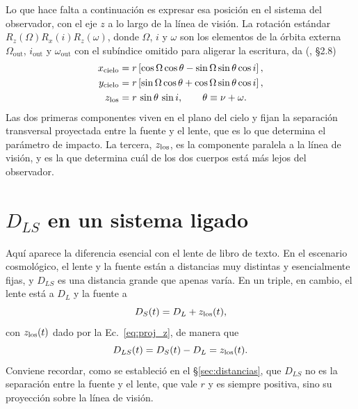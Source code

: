 \documentclass[11pt,a4paper,openany]{book}
\begin{document}
Lo que hace falta a continuaci\'on es expresar esa posici\'on en el sistema
del observador, con el eje $z$ a lo largo de la l\'inea de visi\'on. La
rotaci\'on est\'andar $R_z(\Omega)R_x(i)R_z(\omega)$, donde $\Omega$, $i$ y
$\omega$ son los elementos de la \'orbita externa
$\Omega_\mathrm{out}$, $i_\mathrm{out}$ y $\omega_\mathrm{out}$ con el
sub\'indice omitido para aligerar la escritura, da
(\citealp{MurrayDermott1999}, \S2.8)
\begin{align}
  x_{\rm cielo} &= r\left[\cos\Omega\cos\theta
                  -\sin\Omega\sin\theta\cos i\right], \label{eq:proj_x}\\
  y_{\rm cielo} &= r\left[\sin\Omega\cos\theta
                  +\cos\Omega\sin\theta\cos i\right], \label{eq:proj_y}\\
  z_{\rm los}   &= r\,\sin\theta\,\sin i ,
  \qquad \theta\equiv\nu+\omega .
  \label{eq:proj_z}
\end{align}
Las dos primeras componentes viven en el plano del cielo y fijan la
separaci\'on transversal proyectada entre la fuente y el lente, que es lo que
determina el par\'ametro de impacto. La tercera, $z_{\rm los}$, es la
componente paralela a la l\'inea de visi\'on, y es la que determina cu\'al de
los dos cuerpos est\'a m\'as lejos del observador.

\section{\texorpdfstring{$D_{LS}$}{D\_LS} en un sistema ligado}
\label{sec:dls}

Aqu\'i aparece la diferencia esencial con el lente de libro de texto. En el
escenario cosmol\'ogico, el lente y la fuente est\'an a distancias muy
distintas y esencialmente fijas, y $D_{LS}$ es una distancia grande que apenas
var\'ia. En un triple, en cambio, el lente est\'a a $D_L$ y la fuente a
\begin{equation}
  D_S(t)=D_L+z_{\rm los}(t) ,
  \label{eq:DS_t}
\end{equation}
con $z_{\rm los}(t)$ dado por la Ec.~\eqref{eq:proj_z}, de manera que
\begin{equation}
  D_{LS}(t)=D_S(t)-D_L=z_{\rm los}(t) .
  \label{eq:DLS_t}
\end{equation}
Conviene recordar, como se estableci\'o en el \S\ref{sec:distancias}, que
$D_{LS}$ no es la separaci\'on entre la fuente y el lente, que vale $r$ y es
siempre positiva, sino su proyecci\'on sobre la l\'inea de visi\'on.
\end{document}

